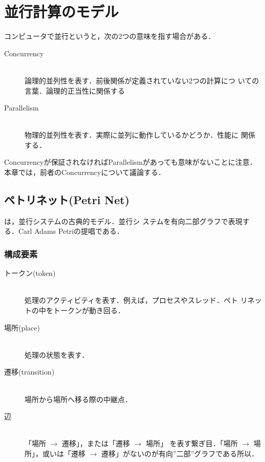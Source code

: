 \chapter{並行計算のモデル}
コンピュータで並行というと，次の2つの意味を指す場合がある．
\begin{description}

 \item[Concurrency] \mbox{} \\
            論理的並列性を表す．前後関係が定義されていない2つの計算につ
            いての言葉．論理的正当性に関係する
 \item[Parallelism] \mbox{} \\
            物理的並列性を表す．実際に並列に動作しているかどうか．性能に
            関係する．
\end{description}

Concurrencyが保証されなければParallelismがあっても意味がないことに注意．
本章では，前者のConcurrencyについて議論する．

\section{ペトリネット(Petri Net)}
は，並行システムの古典的モデル．並行シ
ステムを有向二部グラフで表現する．Carl Adams Petriの提唱である．

\subsection{構成要素}

\begin{description}
 \item[トークン(token)] \mbox{} \\
            処理のアクティビティを表す．例えば，プロセスやスレッド．ペト
            リネットの中をトークンが動き回る．

 \item[場所(place)] \mbox{} \\
            処理の状態を表す．

 \item[遷移(transition)] \mbox{} \\
            場所から場所へ移る際の中継点．

 \item[辺] \mbox{} \\
            「場所 $\rightarrow$ 遷移」，または「遷移 $\rightarrow$ 場所」
            を表す繋ぎ目．「場所 $\rightarrow$ 場所」，或いは「遷移
            $\rightarrow$ 遷移」がないのが有向''二部''グラフである所以．
\end{description}

